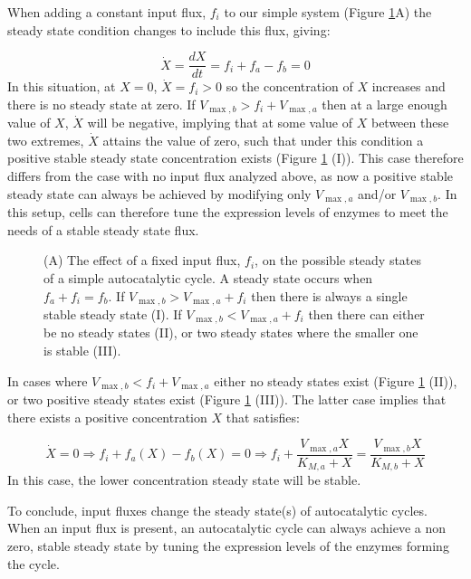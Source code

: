     When adding a constant input flux, $f_i$ to our simple system (Figure \ref{fig:inputcycle}A) the steady state condition changes to include this flux, giving:

    \begin{equation*}
      \dot X = \frac{dX}{dt} = f_i + f_a - f_b = 0
    \end{equation*}
    In this situation, at $X=0$, $\dot X=f_i>0$ so the concentration of $X$ increases and there is no steady state at zero.
    If $V_{\max,b}>f_i+V_{\max,a}$ then at a large enough value of $X$, $\dot X$ will be negative, implying that at some value of $X$ between these two extremes, $\dot{X}$ attains the value of zero, such that under this condition a positive stable steady state concentration exists (Figure \ref{fig:inputcycle} (I)).
    This case therefore differs from the case with no input flux analyzed above, as now a positive stable steady state can always be achieved by modifying only $V_{\max,a}$ and/or $V_{\max,b}$.
    In this setup, cells can therefore tune the expression levels of enzymes to meet the needs of a stable steady state flux.


    \begin{figure}[!htb]
\iftoggle{elifesubmission} { }
{
        \centering{
            }
        }
      \caption{\label{fig:inputcycle}
        (A) The effect of a fixed input flux, $f_i$, on the possible steady states of a simple autocatalytic cycle.
        A steady state occurs when $f_a+f_i=f_b$.
        If $V_{\max,b}>V_{\max,a}+f_i$ then there is always a single stable steady state (I).
        If $V_{\max,b}<V_{\max,a}+f_i$ then there can either be no steady states (II), or two steady states where the smaller one is stable (III).
      }
    \end{figure}

    In cases where $V_{\max,b}<f_i+V_{\max,a}$ either no steady states exist (Figure \ref{fig:inputcycle} (II)), or two positive steady states exist (Figure \ref{fig:inputcycle} (III)).
    The latter case implies that there exists a positive concentration $X$ that satisfies:

    \begin{equation*}
        \dot X = 0 \Rightarrow f_i + f_a(X) - f_b(X) = 0 \Rightarrow f_i+\frac{V_{\max,a}X}{K_{M,a}+X} = \frac{V_{\max,b}X}{K_{M,b}+X}
    \end{equation*}
  In this case, the lower concentration steady state will be stable.

  To conclude, input fluxes change the steady state(s) of autocatalytic cycles.
  When an input flux is present, an autocatalytic cycle can always achieve a non zero, stable steady state by tuning the expression levels of the enzymes forming the cycle.

